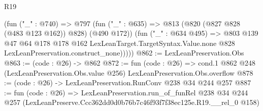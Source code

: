\begin{lexlean}{R19}
\begin{coremodule}
          (fun ("_" : @740) =>
          @797
            (fun ("_" : @635) => @813 (@820 (@827 @828 (@483 @123 @162)) @828) (@490 @172))
            (fun ("_" : @634 @495) =>
            @803
              @139
              @47
              @64
              @178
              @178
              @162
              LexLeanTarget.TargetSyntax.Value.none
              @828
              LexLeanPreservation.construct_none)))))
@862 := LexLeanPreservation.Obs
@863 := (code : @26) -> @862
@872 := fun (code : @26) =>
  cond.{1} @862 @248 (LexLeanPreservation.Obs.value @256) LexLeanPreservation.Obs.overflow
@878 := (code : @26) -> LexLeanPreservation.RunConv @238 @34 @244 @257
@887 := fun (code : @26) =>
  LexLeanPreservation.run_of_funRel
    @238
    @34
    @244
    @257
    (LexLeanPreserve.Ccc362dd0d0b76b7c46f93f7f38ec125e.R19.__rel_0 @158)
\end{coremodule}
\end{lexlean}
